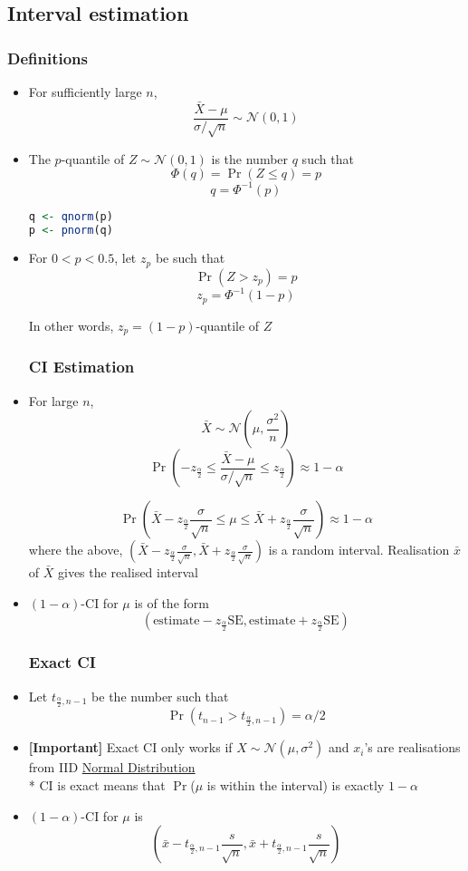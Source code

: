 \documentclass{article}
\begin{document}
\begin{multicols}{2}
\subsection{Interval estimation}
\subsubsection{Definitions}
\begin{itemize}
	\item For sufficiently large $n$,
	$$\frac{\bar{X}-\mu}{\sigma/\sqrt{n}} \sim \mathcal{N}(0,1)$$
	\item The $p$-quantile of $Z\sim\mathcal{N}(0,1)$ is the number $q$ such that
	$$\Phi(q) = \Pr(Z\leq q) = p$$
	$$q = \Phi^{-1}(p)$$
	\begin{lstlisting}[language=R]
q <- qnorm(p)
p <- pnorm(q)\end{lstlisting}
	\item For $0 < p < 0.5$, let $z_p$ be such that
	$$\Pr(Z > z_p) = p$$
	$$z_p = \Phi^{-1}(1-p)$$

	In other words, $z_p = (1-p)$-quantile of $Z$
\subsubsection{CI Estimation}
	\item For large $n$,
	$$\bar{X} \sim \mathcal{N}\left(\mu, \frac{\sigma^2}{n}\right)$$
	$$\Pr\left(-z_{\frac{\alpha}{2}} \leq \frac{\bar{X}-\mu}{\sigma/\sqrt{n}}\leq z_{\frac{\alpha}{2}} \right) \approx 1-\alpha$$

	$$\Pr\left( \bar{X} - z_{\frac{\alpha}{2}}\frac{\sigma}{\sqrt{n}} \leq \mu \leq \bar{X} + z_{\frac{\alpha}{2}}\frac{\sigma}{\sqrt{n}}\right) \approx 1-\alpha$$
	where the above, $\left( \bar{X} - z_{\frac{\alpha}{2}}\frac{\sigma}{\sqrt{n}} , \bar{X} + z_{\frac{\alpha}{2}}\frac{\sigma}{\sqrt{n}}\right)$ is a random interval. Realisation $\bar{x}$ of $\bar{X}$ gives the realised interval
	\item $(1-\alpha)$-CI for $\mu$ is of the form
	$$\left(\text{estimate} - z_{\frac{\alpha}{2}}\text{SE},\text{estimate} + z_{\frac{\alpha}{2}}\text{SE} \right)$$
\subsubsection{Exact CI}
	\item Let $t_{\frac{\alpha}{2}, n-1}$ be the number such that $$\Pr(t_{n-1} > t_{\frac{\alpha}{2}, n-1}) = \alpha/2$$
	\item \textbf{[Important]} Exact CI only works if $X \sim \mathcal{N}(\mu,\sigma^2)$ and $x_i$'s are realisations from IID \underline{Normal Distribution}\\
	* CI is exact means that $\Pr$($\mu$ is within the interval) is exactly $1-\alpha$
	\item $(1-\alpha)$-CI for $\mu$ is
	$$\left( \bar{x} - t_{\frac{\alpha}{2}, n-1}\frac{s}{\sqrt{n}},\bar{x} + t_{\frac{\alpha}{2}, n-1}\frac{s}{\sqrt{n}}\right)$$
\end{itemize}

\end{multicols}
\end{document}
